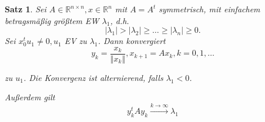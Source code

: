 \documentclass{book}
\newtheorem{theorem}[algorithm]{Satz}
\def\R{\mathbb{R}}
\begin{document}
            \begin{theorem}\label{s4.12}
                Sei $A\in\R^{n\times n},x\in\R^n$ mit $A=A^t$ symmetrisch, mit einfachem betragsmäßig 
                größtem EW $\lambda_1$, d.h. 
                \[\vert \lambda_1\vert > \left\vert \lambda_2 \right\vert \geq \dots \geq \left\vert \lambda_n \right\vert\geq 0.\]
                Sei $x_0^tu_1\neq 0,u_1$ EV zu $\lambda_1$. Dann konvergiert 
                \begin{equation*}
                    y_k=\frac{x_k}{\left\Vert x_k \right\Vert}, x_{k+1}=Ax_k,k=0,1,\dots 
                \end{equation*}

                zu $u_1$. Die Konvergenz ist alternierend, falls $\lambda_1<0$.

                Außerdem gilt 
                \begin{equation}\label{g4.4}
                    y_k^t Ay_k\stackrel{k\to\infty}{\to}\lambda_1
                \end{equation}

            \end{theorem}
\end{document}
